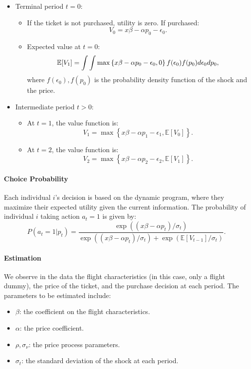 \documentclass[12pt]{article}
\begin{document}
\begin{itemize}
    \item Terminal period $t=0$:
          \begin{itemize}
              \item If the ticket is not purchased, utility is zero. If purchased:
                    \[
                        V_0 = x\beta - \alpha p_0 - \epsilon_0.
                    \]
              \item Expected value at \( t = 0 \):
                    \[
                        \mathbb{E}[V_1] = \int\int \max\left\{x\beta - \alpha p_0 - \epsilon_0, 0\right\} f(\epsilon_0)f(p_0) d\epsilon_0dp_0,
                    \]
                    where \( f(\epsilon_0), f(p_0)\) is the probability density function of the
                    shock and the price.
          \end{itemize}
    \item Intermediate period $t>0$:
          \begin{itemize}
              \item  At \( t = 1 \), the value function is:
                    \[
                        V_1 = \max \left\{ x\beta - \alpha p_1 - \epsilon_1, \mathbb{E}[V_0] \right\}.
                    \]
              \item At \( t = 2 \), the value function is:
                    \[
                        V_2 = \max \left\{ x\beta - \alpha p_2 - \epsilon_2, \mathbb{E}[V_1] \right\}.
                    \]

          \end{itemize}
\end{itemize}

\paragraph{Choice Probability}
Each individual \( i \)'s decision is based on the dynamic program, where they
maximize their expected utility given the current information. The probability
of individual \( i \) taking action \( a_t = 1 \) is given by:
\[
    P(a_t = 1 | p_t) = \frac{\exp((x\beta - \alpha p_t) / \sigma_t)}{\exp((x\beta - \alpha p_t) / \sigma_t) + \exp(\mathbb{E}[V_{t-1}] / \sigma_t)}.
\]

\paragraph{Estimation}
We observe in the data the flight characteristics (in this case, only a flight
dummy), the price of the ticket, and the purchase decision at each period. The
parameters to be estimated include:
\begin{itemize}
    \item $\beta$: the coefficient on the flight characteristics.
    \item $\alpha$: the price coefficient.
    \item $\rho,\sigma_{\nu}$: the price process parameters.
    \item $\sigma_t$: the standard deviation of the shock at each period.
\end{itemize}
\end{document}
